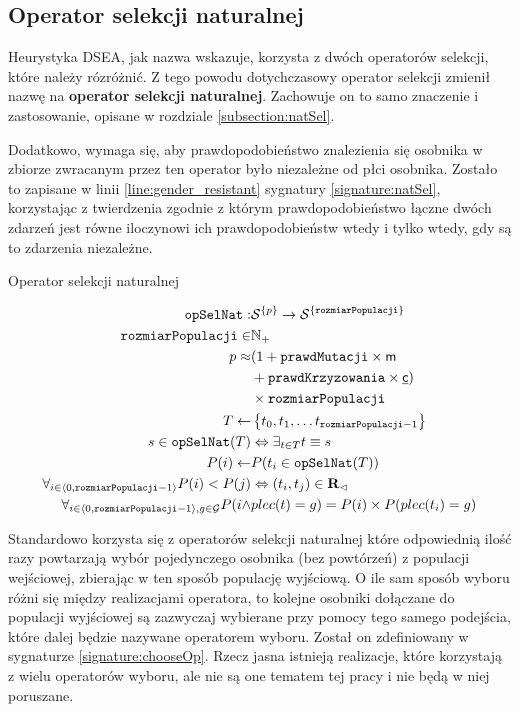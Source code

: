 \documentclass[./FM_mgr.tex]{subfiles}
\begin{document}
\subsection{Operator selekcji naturalnej} \label{subsection:new_natSel}

Heurystyka DSEA, jak nazwa wskazuje, korzysta z dwóch operatorów selekcji, które należy rózróżnić. 
Z tego powodu dotychczasowy operator selekcji zmienił nazwę na \textbf{operator selekcji naturalnej}. 
Zachowuje on to samo znaczenie i zastosowanie, opisane w rozdziale \ref{subsection:natSel}. 

Dodatkowo, wymaga się, aby prawdopodobieństwo znalezienia się osobnika w zbiorze zwracanym przez ten operator było niezależne od płci osobnika. 
Zostało to zapisane w linii \ref{line:gender_resistant} sygnatury \ref{signature:natSel}, korzystając z twierdzenia zgodnie z którym prawdopodobieństwo łączne dwóch zdarzeń jest równe iloczynowi ich prawdopodobieństw wtedy i tylko wtedy, gdy są to zdarzenia niezależne.

\begin{signature}
	\caption{Operator selekcji naturalnej \label{signature:natSel}}
	\begin{align}
	\mathtt{opSelNat}: &{\mathcal{S}}^{ \{ p \}} \rightarrow {\mathcal{S}}^{ \{ \mathtt{rozmiarPopulacji} \}} \\
	\mathtt{rozmiarPopulacji} \in &\mathbb{N}_{+} \\
	p \approx &(1 + \mathtt{prawdMutacji} \times \mathsf{m} \\
	&+ \mathtt{prawdKrzyzowania} \times \mathsf{\underline{c}}) \\
	&\times \mathtt{rozmiarPopulacji} \\
	T \gets &\left\{ t_0, t_1, \ldots t_{\mathtt{rozmiarPopulacji}-1} \right\} \\
	s \in \mathtt{opSelNat}(T) &\Leftrightarrow \exists_{t \in T}  t \equiv s \\
	P(i) \gets &P(t_i \in \mathtt{opSelNat}(T)) \\
	\forall_{i \in \langle0, \mathtt{rozmiarPopulacji}-1\rangle}P(i) < P(j) &\Leftrightarrow (t_i, t_j) \in {\mathbf{R}}_{\lhd} \\
	\label{line:gender_resistant}
	\forall_{i \in \langle0, \mathtt{rozmiarPopulacji}-1\rangle, g \in \mathcal{G}}P(i \wedge & plec(t) = g) = P(i) \times P(plec(t_i) = g)
	\end{align}
\end{signature}

Standardowo korzysta się z operatorów selekcji naturalnej które odpowiednią ilość razy powtarzają wybór pojedynczego osobnika (bez powtórzeń) z populacji wejściowej, zbierając w ten sposób populację wyjściową. 
O ile sam sposób wyboru różni się między realizacjami operatora, to kolejne osobniki dołączane do populacji wyjściowej są zazwyczaj wybierane przy pomocy tego samego podejścia, które dalej będzie nazywane operatorem wyboru.
Został on zdefiniowany w sygnaturze \ref{signature:chooseOp}.
Rzecz jasna istnieją realizacje, które korzystają z wielu operatorów wyboru, ale nie są one tematem tej pracy i nie będą w niej poruszane.
\end{document}
